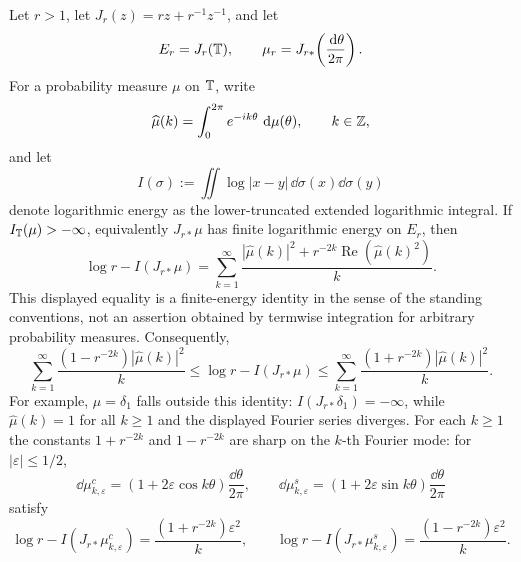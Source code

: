 \begin{theorem}\label{thm:finite-energy-joukowsky-fourier-identity}
Let \(r>1\), let \(J_r(z)=rz+r^{-1}z^{-1}\), and let
\[
E_r=J_r(\mathbb{T}),\qquad \mu_r=J_{r\ast}\!\left(\frac{\,\mathrm{d}\theta}{2\pi}\right).
\]
For a probability measure \(\mu\) on \(\mathbb{T}\), write
\[
\widehat\mu(k)=\int_{0}^{2\pi}e^{-ik\theta}\,\,\mathrm{d}\mu(\theta),\qquad k\in\mathbb{Z},
\]
and let
\[
I(\sigma):=\iint\log|x-y|\,\dd\sigma(x)\dd\sigma(y)
\]
denote logarithmic energy as the lower-truncated extended logarithmic integral.
If \(I_{\mathbb{T}}(\mu)>-\infty\), equivalently \(J_{r\ast}\mu\) has finite logarithmic energy on \(E_r\), then
\[
\boxed{\;
\log r-I(J_{r\ast}\mu)
=\sum_{k=1}^{\infty}
\frac{|\widehat\mu(k)|^2+r^{-2k}\operatorname{Re}(\widehat\mu(k)^2)}{k}.
\;}
\]
This displayed equality is a finite-energy identity in the sense of the
standing conventions, not an assertion obtained by termwise integration for
arbitrary probability measures.
Consequently,
\[
\sum_{k=1}^{\infty}\frac{(1-r^{-2k})|\widehat\mu(k)|^2}{k}
\le \log r-I(J_{r\ast}\mu)
\le
\sum_{k=1}^{\infty}\frac{(1+r^{-2k})|\widehat\mu(k)|^2}{k}.
\]
For example, \(\mu=\delta_1\) falls outside this identity:
\(I(J_{r\ast}\delta_1)=-\infty\), while \(\widehat\mu(k)=1\) for all
\(k\ge1\) and the displayed Fourier series diverges.
For each \(k\ge1\) the constants \(1+r^{-2k}\) and \(1-r^{-2k}\) are sharp on the \(k\)-th Fourier mode: for \(|\varepsilon|\le1/2\),
\[
\dd\mu^c_{k,\varepsilon}=(1+2\varepsilon\cos k\theta)\frac{\dd\theta}{2\pi},
\qquad
\dd\mu^s_{k,\varepsilon}=(1+2\varepsilon\sin k\theta)\frac{\dd\theta}{2\pi}
\]
satisfy
\[
\log r-I(J_{r\ast}\mu^c_{k,\varepsilon})=\frac{(1+r^{-2k})\varepsilon^2}{k},
\qquad
\log r-I(J_{r\ast}\mu^s_{k,\varepsilon})=\frac{(1-r^{-2k})\varepsilon^2}{k}.
\]
\end{theorem}

